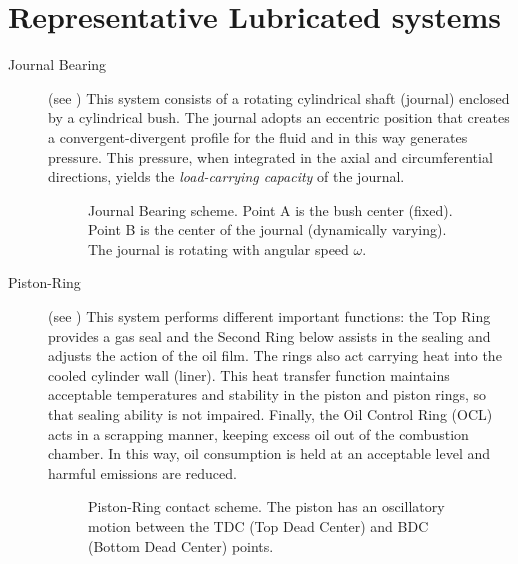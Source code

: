 \section{Representative Lubricated systems}
\begin{description}
\item[Journal Bearing] (see ) This system consists of a rotating cylindrical shaft 
(journal) enclosed by a cylindrical bush. The journal adopts an eccentric position that creates a
convergent-divergent profile for the fluid and in this way generates pressure. This pressure, when integrated in the axial and circumferential directions, yields the \emph{load-carrying capacity} of the journal.
\begin{figure}[ht!]
\centering \def\svgwidth{\textwidth}	
\small{}\caption[Journal Bearing scheme]{Journal Bearing scheme. Point A is the bush center (fixed). Point B is the center of the journal (dynamically varying). The journal is rotating with angular speed $\omega$.}\label{fig:bearing_scheme}
\end{figure}
\item[Piston-Ring] (see ) This system performs different important functions: the Top Ring provides a gas seal and the Second Ring below assists in the sealing and adjusts the action of the oil film. The rings also act carrying heat into the cooled cylinder wall (liner). This heat transfer function maintains acceptable temperatures and stability in the piston and piston rings, so that sealing ability is not impaired. Finally, the Oil Control Ring (OCL) acts in a scrapping manner, keeping excess oil out of the combustion chamber. In this way, oil consumption is held at an acceptable level and harmful emissions are reduced.
\begin{figure}[ht!]
\centering \def\svgwidth{\textwidth}
\small{}\caption[Piston-Ring contact scheme]{Piston-Ring contact scheme. The piston has an oscillatory motion between the TDC (Top Dead Center) and BDC (Bottom Dead Center) points.}\label{fig:cilindro_piston_1}
\end{figure}
\end{description}
